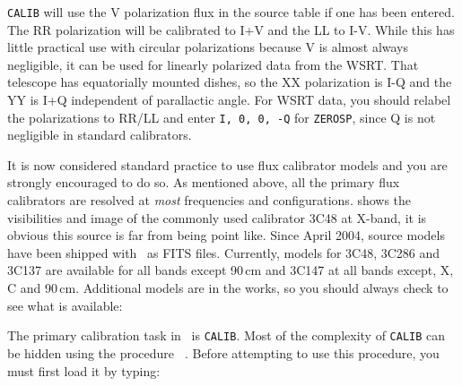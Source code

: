 {\tt CALIB} will use the V polarization flux in the source table if
one has been entered.  The RR polarization will be calibrated to I+V
and the LL to I-V.  While this has little practical use with circular
polarizations because V is almost always negligible, it can be used
for linearly polarized data from the WSRT\@.  That telescope has
equatorially mounted dishes, so the XX polarization is I-Q and the
YY is I+Q independent of parallactic angle.  For WSRT data, you should
relabel the polarizations to RR/LL and enter {\tt I, 0, 0, -Q} for
{\tt ZEROSP}, since Q is not negligible in standard calibrators.



It is now considered standard practice to use flux calibrator models
and you are strongly encouraged to do so.  As mentioned above, all the
primary flux calibrators are resolved at {\it most} frequencies and
configurations.   shows the visibilities and image of
the commonly used calibrator 3C48 at X-band, it is obvious this source
is far from being point like.  Since April 2004, source models have
been shipped with \AIPS\ as FITS files. Currently, models for 3C48,
3C286 and 3C137 are available for all bands except 90\,cm and 3C147 at
all bands except, X, C and 90\,cm.  Additional models are in the
works, so you should always check to see what is available:

The primary calibration task in \AIPS\ is {\tt CALIB}\@.  Most of the
complexity of {\tt CALIB} can be hidden using the procedure {\tt
{}}\@.  Before attempting to use this procedure, you must
first load it by typing:

